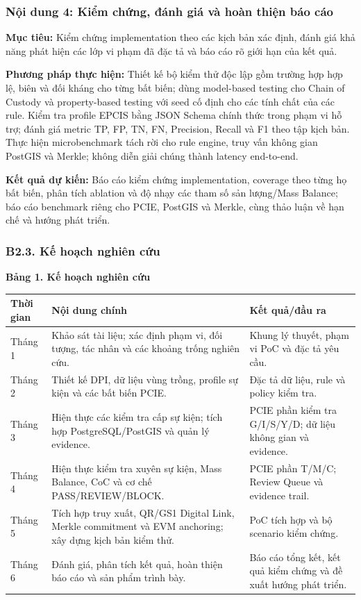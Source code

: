 \documentclass[letterpaper,11pt]{article}
\begin{document}
\subsubsection*{Nội dung 4: Kiểm chứng, đánh giá và hoàn thiện báo cáo}
\textbf{Mục tiêu:} Kiểm chứng implementation theo các kịch bản xác định, đánh giá khả năng phát hiện các lớp vi phạm đã đặc tả và báo cáo rõ giới hạn của kết quả.

\textbf{Phương pháp thực hiện:} Thiết kế bộ kiểm thử độc lập gồm trường hợp hợp lệ, biên và đối kháng cho từng bất biến; dùng model-based testing cho Chain of Custody và property-based testing với seed cố định cho các tính chất của các rule. Kiểm tra profile EPCIS bằng JSON Schema chính thức trong phạm vi hỗ trợ; đánh giá metric TP, FP, TN, FN, Precision, Recall và F1 theo tập kịch bản. Thực hiện microbenchmark tách rời cho rule engine, truy vấn không gian PostGIS và Merkle; không diễn giải chúng thành latency end-to-end.

\textbf{Kết quả dự kiến:} Báo cáo kiểm chứng implementation, coverage theo từng họ bất biến, phân tích ablation và độ nhạy các tham số sản lượng/Mass Balance; báo cáo benchmark riêng cho PCIE, PostGIS và Merkle, cùng thảo luận về hạn chế và hướng phát triển.

\clearpage
\subsubsection*{B2.3. Kế hoạch nghiên cứu}
\begin{center}
\textbf{Bảng 1. Kế hoạch nghiên cứu}
\end{center}
\begin{tabularx}{\textwidth}{|>{\centering\arraybackslash}p{1.5cm}|X|X|}
\hline
\rowcolor{uitblue}\color{white}\textbf{Thời gian} & \centering\color{white}\textbf{Nội dung chính} & \centering\color{white}\textbf{Kết quả/đầu ra}\arraybackslash \\
\hline
Tháng 1 & Khảo sát tài liệu; xác định phạm vi, đối tượng, tác nhân và các khoảng trống nghiên cứu. & Khung lý thuyết, phạm vi PoC và đặc tả yêu cầu. \\
\hline
Tháng 2 & Thiết kế DPI, dữ liệu vùng trồng, profile sự kiện và các bất biến PCIE. & Đặc tả dữ liệu, rule và policy kiểm tra. \\
\hline
Tháng 3 & Hiện thực các kiểm tra cấp sự kiện; tích hợp PostgreSQL/PostGIS và quản lý evidence. & PCIE phần kiểm tra G/I/S/Y/D; dữ liệu không gian và evidence. \\
\hline
Tháng 4 & Hiện thực kiểm tra xuyên sự kiện, Mass Balance, CoC và cơ chế PASS/REVIEW/BLOCK. & PCIE phần T/M/C; Review Queue và evidence trail. \\
\hline
Tháng 5 & Tích hợp truy xuất, QR/GS1 Digital Link, Merkle commitment và EVM anchoring; xây dựng kịch bản kiểm thử. & PoC tích hợp và bộ scenario kiểm chứng. \\
\hline
Tháng 6 & Đánh giá, phân tích kết quả, hoàn thiện báo cáo và sản phẩm trình bày. & Báo cáo tổng kết, kết quả kiểm chứng và đề xuất hướng phát triển. \\
\hline
\end{tabularx}
\end{document}
